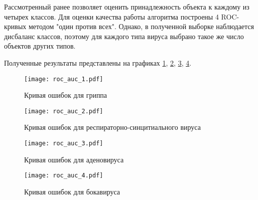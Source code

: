 \documentclass{article}
\begin{document}
Рассмотренный ранее позволяет оценить принадлежность объекта к каждому из четырех классов. Для оценки качества работы алгоритма построены 4 ROC-кривых методом "один против всех". Однако, в полученной выборке наблюдается дисбаланс классов, поэтому для каждого типа вируса выбрано такое же число объектов других типов.


Полученные результаты представлены на графиках \ref{fig:roc_auc_1}, \ref{fig:roc_auc_2}, \ref{fig:roc_auc_3}, \ref{fig:roc_auc_4}.

\begin{figure}[H]
    \centering
    \texttt{[image: roc\_auc\_1.pdf]}
    \caption{Кривая ошибок для гриппа}
    \label{fig:roc_auc_1}
\end{figure}

\begin{figure}[H]
    \centering
    \texttt{[image: roc\_auc\_2.pdf]}
    \caption{Кривая ошибок для респираторно-синцитиального вируса}
    \label{fig:roc_auc_2}
\end{figure}

\begin{figure}[H]
    \centering
    \texttt{[image: roc\_auc\_3.pdf]}
    \caption{Кривая ошибок для аденовируса}
    \label{fig:roc_auc_3}
\end{figure}

\begin{figure}[H]
    \centering
    \texttt{[image: roc\_auc\_4.pdf]}
    \caption{Кривая ошибок для бокавируса}
    \label{fig:roc_auc_4}
\end{figure}


%
%
\end{document}

